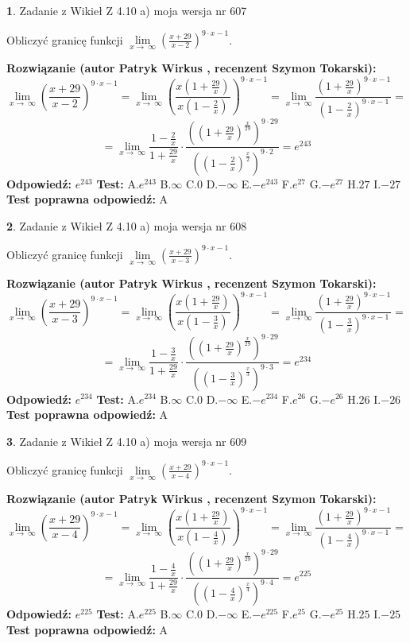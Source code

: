 \documentclass[12pt, a4paper]{article}
\theoremstyle{definition} %
\newtheorem{zad}{}
\newcommand{\zadStart}[1]{\begin{zad}#1\newline}
\newcommand{\zadStop}{\end{zad}}
\newcommand{\rozwStart}[2]{\noindent \textbf{Rozwiązanie (autor #1 , recenzent #2): }\newline}
\newcommand{\rozwStop}{\newline}
\newcommand{\odpStart}{\noindent \textbf{Odpowiedź:}\newline}
\newcommand{\odpStop}{\newline}
\newcommand{\testStart}{\noindent \textbf{Test:}\newline}
\newcommand{\testStop}{\newline}
\newcommand{\kluczStart}{\noindent \textbf{Test poprawna odpowiedź:}\newline}
\newcommand{\kluczStop}{\newline}
\begin{document}
\zadStart{Zadanie z Wikieł Z 4.10 a) moja wersja nr 607}

Obliczyć granicę funkcji  $\lim\limits_{x\to\ \infty}(\frac{x+29}{x-2})^{9\cdot x-1}$.
\zadStop
\rozwStart{Patryk Wirkus}{Szymon Tokarski}
$$\lim\limits_{x\to\ \infty}(\frac{x+29}{x-2})^{9\cdot x-1} = \lim\limits_{x\to\ \infty}(\frac{x(1+\frac{29}{x})}{x(1-\frac{2}{x})})^{9\cdot x-1}=\lim\limits_{x\to\ \infty}\frac{(1+\frac{29}{x})^{9\cdot x-1}}{(1-\frac{2}{x})^{9\cdot x-1}}=$$
$$=\lim\limits_{x\to\ \infty}\frac{1-\frac{2}{x}}{1+\frac{29}{x}}\cdot\frac{((1+\frac{29}{x})^{\frac{x}{29}})^{9\cdot29}}{((1-\frac{2}{x})^{\frac{x}{2}})^{9\cdot2}}=e^{243}$$
\rozwStop
\odpStart
$e^{243}$
\odpStop
\testStart
A.$e^{243}$ B.$\infty$ C.$0$ D.$-\infty$ E.$-e^{243}$
F.$e^{27}$ G.$-e^{27}$
H.$27$
I.$-27$
\testStop
\kluczStart
A
\kluczStop



\zadStart{Zadanie z Wikieł Z 4.10 a) moja wersja nr 608}

Obliczyć granicę funkcji  $\lim\limits_{x\to\ \infty}(\frac{x+29}{x-3})^{9\cdot x-1}$.
\zadStop
\rozwStart{Patryk Wirkus}{Szymon Tokarski}
$$\lim\limits_{x\to\ \infty}(\frac{x+29}{x-3})^{9\cdot x-1} = \lim\limits_{x\to\ \infty}(\frac{x(1+\frac{29}{x})}{x(1-\frac{3}{x})})^{9\cdot x-1}=\lim\limits_{x\to\ \infty}\frac{(1+\frac{29}{x})^{9\cdot x-1}}{(1-\frac{3}{x})^{9\cdot x-1}}=$$
$$=\lim\limits_{x\to\ \infty}\frac{1-\frac{3}{x}}{1+\frac{29}{x}}\cdot\frac{((1+\frac{29}{x})^{\frac{x}{29}})^{9\cdot29}}{((1-\frac{3}{x})^{\frac{x}{3}})^{9\cdot3}}=e^{234}$$
\rozwStop
\odpStart
$e^{234}$
\odpStop
\testStart
A.$e^{234}$ B.$\infty$ C.$0$ D.$-\infty$ E.$-e^{234}$
F.$e^{26}$ G.$-e^{26}$
H.$26$
I.$-26$
\testStop
\kluczStart
A
\kluczStop



\zadStart{Zadanie z Wikieł Z 4.10 a) moja wersja nr 609}

Obliczyć granicę funkcji  $\lim\limits_{x\to\ \infty}(\frac{x+29}{x-4})^{9\cdot x-1}$.
\zadStop
\rozwStart{Patryk Wirkus}{Szymon Tokarski}
$$\lim\limits_{x\to\ \infty}(\frac{x+29}{x-4})^{9\cdot x-1} = \lim\limits_{x\to\ \infty}(\frac{x(1+\frac{29}{x})}{x(1-\frac{4}{x})})^{9\cdot x-1}=\lim\limits_{x\to\ \infty}\frac{(1+\frac{29}{x})^{9\cdot x-1}}{(1-\frac{4}{x})^{9\cdot x-1}}=$$
$$=\lim\limits_{x\to\ \infty}\frac{1-\frac{4}{x}}{1+\frac{29}{x}}\cdot\frac{((1+\frac{29}{x})^{\frac{x}{29}})^{9\cdot29}}{((1-\frac{4}{x})^{\frac{x}{4}})^{9\cdot4}}=e^{225}$$
\rozwStop
\odpStart
$e^{225}$
\odpStop
\testStart
A.$e^{225}$ B.$\infty$ C.$0$ D.$-\infty$ E.$-e^{225}$
F.$e^{25}$ G.$-e^{25}$
H.$25$
I.$-25$
\testStop
\kluczStart
A
\kluczStop
\end{document}
